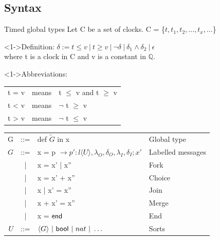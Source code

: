 \documentclass[8 pt]{beamer}
\newcommand{\kf}[1]{\textup{\textsf{#1}}\xspace}
\newcommand{\G}{\ensuremath{G}}
\newcommand{\UT}{\ensuremath{U}}
\newcommand{\End}{\kf{end}}
\newcommand{\Bool}{\kf{bool}}
\begin{document}
\subsection{Syntax}
\begin{frame}{Timed global types}
Let C be a set of clocks. C = \{$t, t_1, t_2, ..., t_x, ...$\}
\begin{block}<1->{Definition:}
$\delta := t \le v ~|~ t \ge v ~|~ \neg \delta ~|~ \delta_{1} \wedge \delta_{2} ~|~ \epsilon$ \\
where t is a clock in C and v is a constant in $\mathbb{Q}$.
\end{block}
\begin{block}<1->{Abbreviations:}
\begin{tabular}{rcl}
t = v& means& t $\le$ v and  t $\ge$ v\\
t < v& means& $\neg$ t $\ge$ v\\
t > v& means& $\neg$ t $\le$ v\\
\end{tabular}
\end{block}
\begin{center}
\begin{tabular}{rcll}
G & ::= & def $\tilde{\G}$ in x & Global type \\
$\G$ & ::= & x  = p $\rightarrow p' : l \langle \UT \rangle, \lambda_{O}, \delta_{O}, \lambda_{I}, \delta_{I} ;x' $ & Labelled messages\\
& | & x = x' | x'' & Fork\\
& | & x = x' + x'' & Choice\\
& | & x | x' = x'' & Join\\
& | & x + x' = x'' & Merge\\
& | & x = $\End$ & End\\
\UT & ::= &$ \langle G\rangle\ |\ \Bool\ |\ nat \ |\ \ldots\ $ & Sorts
\end{tabular}
\end{center}
\end{frame}
\end{document}
